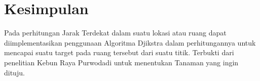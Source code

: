 \documentclass[conference]{IEEEtran}
\begin{document}
	\section{Kesimpulan}
	Pada perhitungan Jarak Terdekat dalam suatu lokasi atau ruang dapat diimplementasikan penggunaan Algoritma Djikstra dalam perhitungannya untuk mencapai suatu target pada ruang tersebut dari suatu titik. Terbukti dari penelitian Kebun Raya Purwodadi untuk menentukan Tanaman yang ingin dituju. \\

	
	
	
\end{document}
